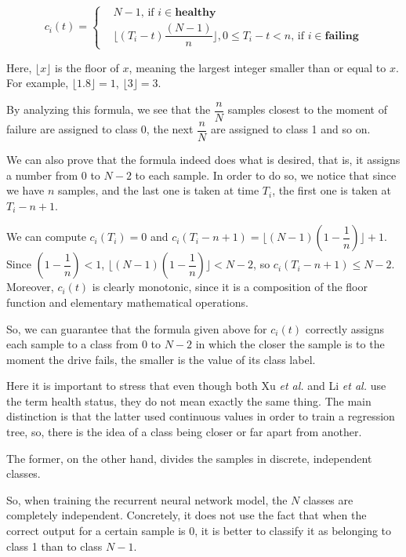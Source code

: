 \begin{equation}\label{eq:linear_discrete_health_status}
  c_i(t) = 
  \begin{cases}
    & N-1 \text{, if } i \in \mathbf{healthy} \\
    & \biggl\lfloor(T_i-t)\dfrac{(N-1)}{n}\biggr\rfloor, 0 \leq T_i - t < n \text{, if } i \in \mathbf{failing}
  \end{cases}
\end{equation}

Here, $\lfloor x \rfloor$ is the floor of $x$, meaning the largest integer smaller than or equal to $x$.
For example, $\lfloor 1.8 \rfloor = 1$, $\lfloor 3 \rfloor = 3$.

By analyzing this formula, we see that the $\dfrac{n}{N}$ samples closest to the moment of failure are assigned to class 0, the next $\dfrac{n}{N}$ are assigned to class 1 and so on.

We can also prove that the formula indeed does what is desired, that is, it assigns a number from 0 to $N-2$ to each sample.
In order to do so, we notice that since we have $n$ samples, and the last one is taken at time $T_i$, the first one is taken at $T_i - n + 1$.

We can compute $c_i(T_i) = 0$ and $c_i(T_i - n + 1) = \biggl\lfloor(N-1)\left(1-\dfrac{1}{n}\right)\biggr\rfloor + 1$.
Since $\left(1-\dfrac{1}{n}\right) < 1$, $\biggl\lfloor(N-1)\left(1-\dfrac{1}{n}\right)\biggr\rfloor < N - 2$, so $c_i(T_i - n + 1) \leq N - 2$.
Moreover, $c_i(t)$ is clearly monotonic, since it is a composition of the floor function and elementary mathematical operations.

So, we can guarantee that the formula given above for $c_i(t)$ correctly assigns each sample to a class from $0$ to $N-2$ in which the closer the sample is to the moment the drive fails, the smaller is the value of its class label.

Here it is important to stress that even though both Xu \textit{et al.} \cite{Xu16} and Li \textit{et al.} \cite{Li14} use the term health status, they do not mean exactly the same thing.
The main distinction is that the latter used continuous values in order to train a regression tree, so, there is the idea of a class being closer or far apart from another.

The former, on the other hand, divides the samples in discrete, independent classes.

So, when training the recurrent neural network model, the $N$ classes are completely independent.
Concretely, it does not use the fact that when the correct output for a certain sample is 0, it is better to classify it as belonging to class 1 than to class $N-1$.


